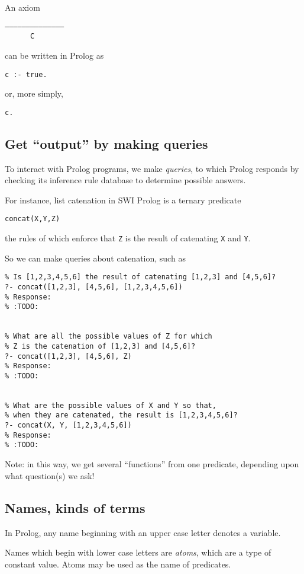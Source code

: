 \documentclass[11pt]{article}
\begin{document}
An axiom
\begin{verbatim}
––––––––––––––
      C
\end{verbatim}
can be written in Prolog as
\begin{verbatim}
c :- true.
\end{verbatim}
or, more simply,
\begin{verbatim}
c.
\end{verbatim}

\subsection{Get “output” by making queries}
\label{sec:org1c5bff9}
To interact with Prolog programs, we make \emph{queries}, to which Prolog
responds by checking its inference rule database to determine
possible answers.

For instance, list catenation in SWI Prolog is a ternary predicate
\begin{verbatim}
concat(X,Y,Z)
\end{verbatim}
the rules of which enforce that \texttt{Z} is the result
of catenating \texttt{X} and \texttt{Y}.

So we can make queries about catenation, such as
\begin{verbatim}
% Is [1,2,3,4,5,6] the result of catenating [1,2,3] and [4,5,6]?
?- concat([1,2,3], [4,5,6], [1,2,3,4,5,6])
% Response:
% :TODO:


% What are all the possible values of Z for which
% Z is the catenation of [1,2,3] and [4,5,6]?
?- concat([1,2,3], [4,5,6], Z)
% Response:
% :TODO:


% What are the possible values of X and Y so that,
% when they are catenated, the result is [1,2,3,4,5,6]?
?- concat(X, Y, [1,2,3,4,5,6])
% Response:
% :TODO:
\end{verbatim}

Note: in this way, we get several “functions” from one predicate,
depending upon what question(s) we ask!

\subsection{Names, kinds of terms}
\label{sec:orga0990ce}
In Prolog, any name beginning with an upper case letter
denotes a variable.

Names which begin with lower case letters are \emph{atoms},
which are a type of constant value.
Atoms may be used as the name of predicates.
\end{document}
